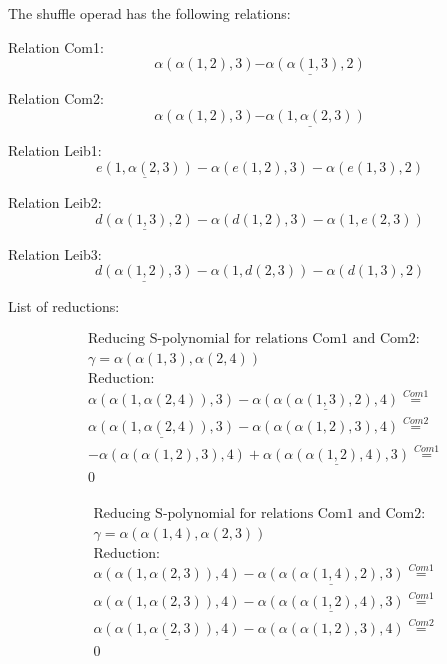 \documentclass[11pt]{amsart}
\begin{document}
 
 
The shuffle operad has the following relations: 

 Relation Com1: 
 $$ 
\alpha(\alpha(1,2),3)\underline{ - \alpha(\alpha(1,3),2)}
 $$ 

 Relation Com2: 
 $$ 
\alpha(\alpha(1,2),3)\underline{ - \alpha(1,\alpha(2,3))}
 $$ 

 Relation Leib1: 
 $$ 
\underline{e(1,\alpha(2,3))} - \alpha(e(1,2),3) - \alpha(e(1,3),2)
 $$ 

 Relation Leib2: 
 $$ 
\underline{d(\alpha(1,3),2)} - \alpha(d(1,2),3) - \alpha(1,e(2,3))
 $$ 

 Relation Leib3: 
 $$ 
\underline{d(\alpha(1,2),3)} - \alpha(1,d(2,3)) - \alpha(d(1,3),2)
 $$ 

 
 
 List of reductions: 
 
\begin{align*} 
& \text{Reducing S-polynomial for relations Com1 and Com2:} \\ 
& \gamma = \alpha(\alpha(1,3),\alpha(2,4)) \\ 
& \text{Reduction}: \\&\alpha(\alpha(1,\alpha(2,4)),3) - \underline{\alpha(\alpha(\alpha(1,3),2),4)} \stackrel{ Com1 }{=}  \\ 
&\underline{\alpha(\alpha(1,\alpha(2,4)),3)} - \alpha(\alpha(\alpha(1,2),3),4) \stackrel{ Com2 }{=}  \\ 
& - \alpha(\alpha(\alpha(1,2),3),4) + \underline{\alpha(\alpha(\alpha(1,2),4),3)} \stackrel{ Com1 }{=}  \\ 
&0\\ 
\end{align*} 
 
\begin{align*} 
& \text{Reducing S-polynomial for relations Com1 and Com2:} \\ 
& \gamma = \alpha(\alpha(1,4),\alpha(2,3)) \\ 
& \text{Reduction}: \\&\alpha(\alpha(1,\alpha(2,3)),4) - \underline{\alpha(\alpha(\alpha(1,4),2),3)} \stackrel{ Com1 }{=}  \\ 
&\alpha(\alpha(1,\alpha(2,3)),4) - \underline{\alpha(\alpha(\alpha(1,2),4),3)} \stackrel{ Com1 }{=}  \\ 
&\underline{\alpha(\alpha(1,\alpha(2,3)),4)} - \alpha(\alpha(\alpha(1,2),3),4) \stackrel{ Com2 }{=}  \\ 
&0\\ 
\end{align*} 
 
\end{document}
